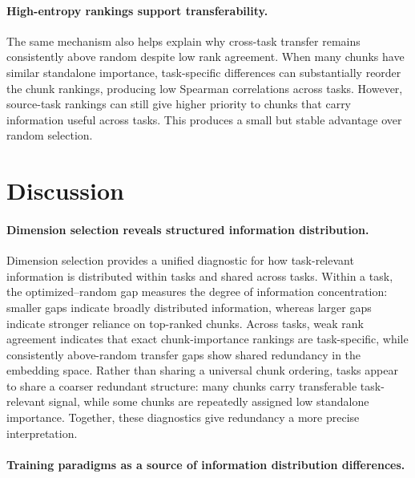\documentclass[11pt]{article}
\begin{document}
\paragraph{High-entropy rankings support transferability.}
The same mechanism also helps explain why cross-task transfer remains consistently above random despite low rank agreement. When many chunks have similar standalone importance, task-specific differences can substantially reorder the chunk rankings, producing low Spearman correlations across tasks. However, source-task rankings can still give higher priority to chunks that carry information useful across tasks. This produces a small but stable advantage over random selection. 

\section{Discussion}
\paragraph{Dimension selection reveals structured information distribution.}
Dimension selection provides a unified diagnostic for how task-relevant information is distributed within tasks and shared across tasks. Within a task, the optimized--random gap measures the degree of information concentration: smaller gaps indicate broadly distributed information, whereas larger gaps indicate stronger reliance on top-ranked chunks. Across tasks, weak rank agreement indicates that exact chunk-importance rankings are task-specific, while consistently above-random transfer gaps show shared redundancy in the embedding space. Rather than sharing a universal chunk ordering, tasks appear to share a coarser redundant structure: many chunks carry transferable task-relevant signal, while some chunks are repeatedly assigned low standalone importance. Together, these diagnostics give redundancy a more precise interpretation.

\paragraph{Training paradigms as a source of information distribution differences.}
\label{sec:training_paradigm_discussion}
\end{document}
